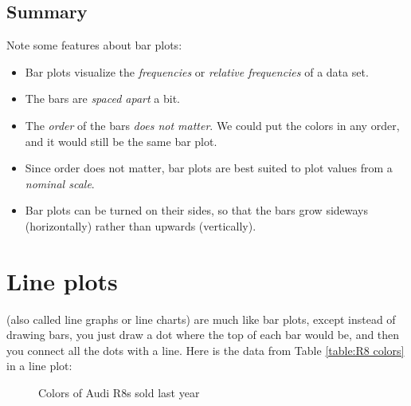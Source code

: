 \documentclass[../../../main.tex]{subfiles}
\begin{document}
\subsection{Summary}

Note some features about bar plots:

\begin{itemize}

  \item Bar plots visualize the \emph{frequencies} or \emph{relative frequencies} of a data set.

  \item The bars are \emph{spaced apart} a bit.
  
  \item The \emph{order} of the bars \emph{does not matter}. We could put the colors in any order, and it would still be the same bar plot.
  
  \item Since order does not matter, bar plots are best suited to plot values from a \emph{nominal scale}.
  
  \item Bar plots can be turned on their sides, so that the bars grow sideways (horizontally) rather than upwards (vertically).

\end{itemize}


\section{Line plots}

 (also called line graphs or line charts) are much like bar plots, except instead of drawing bars, you just draw a dot where the top of each bar would be, and then you connect all the dots with a line. Here is the data from Table \ref{table:R8 colors} in a line plot:

\begin{figure}[ht]
  \caption{\label{plot:R8 colors line plot} Colors of Audi R8s sold last year}
\end{figure}
\end{document}
